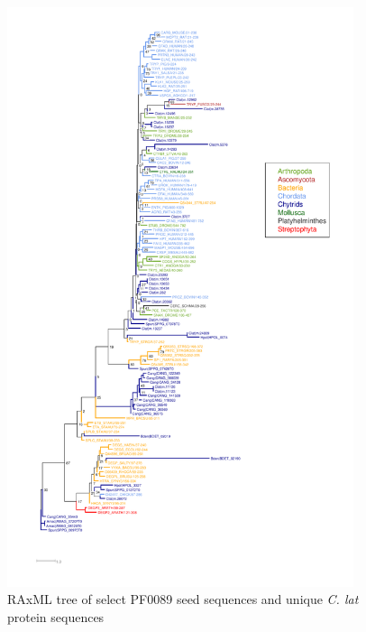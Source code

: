 \begin{figure}[tbp]
  \includegraphics[width=4in]{./Chapter_Coelomomyces/img/PF00089_tree.png}
  \caption[PF00089 RAxML tree]{RAxML tree of select PF0089 seed sequences and unique \textit{C. lat} protein sequences}
  \label{fig:ChClat_PF00089}
\end{figure}


